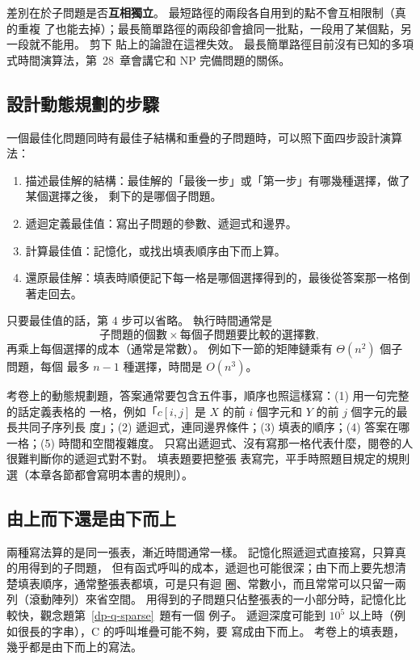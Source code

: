 差別在於子問題是否\textbf{互相獨立}。 最短路徑的兩段各自用到的點不會互相限制（真的重複
了也能去掉）；最長簡單路徑的兩段卻會搶同一批點，一段用了某個點，另一段就不能用。 剪下
貼上的論證在這裡失效。 最長簡單路徑目前沒有已知的多項式時間演算法，第~28~章會講它和
NP 完備問題的關係。

\subsection{設計動態規劃的步驟}
\label{sec:dp-steps}

一個最佳化問題同時有最佳子結構和重疊的子問題時，可以照下面四步設計演算法：

\begin{enumerate}
\item 描述最佳解的結構：最佳解的「最後一步」或「第一步」有哪幾種選擇，做了某個選擇之後，
剩下的是哪個子問題。
\item 遞迴定義最佳值：寫出子問題的參數、遞迴式和邊界。
\item 計算最佳值：記憶化，或找出填表順序由下而上算。
\item 還原最佳解：填表時順便記下每一格是哪個選擇得到的，最後從答案那一格倒著走回去。
\end{enumerate}

只要最佳值的話，第 4 步可以省略。 執行時間通常是
\[
\text{子問題的個數} \times \text{每個子問題要比較的選擇數},
\]
再乘上每個選擇的成本（通常是常數）。 例如下一節的矩陣鏈乘有 $\Theta(n^2)$ 個子問題，每個
最多 $n - 1$ 種選擇，時間是 $O(n^3)$。

\begin{examnote}
考卷上的動態規劃題，答案通常要包含五件事，順序也照這樣寫：(1) 用一句完整的話定義表格的
一格，例如「$c[i, j]$ 是 $X$ 的前 $i$ 個字元和 $Y$ 的前 $j$ 個字元的最長共同子序列長
度」；(2) 遞迴式，連同邊界條件；(3) 填表的順序；(4) 答案在哪一格；(5) 時間和空間複雜度。
只寫出遞迴式、沒有寫那一格代表什麼，閱卷的人很難判斷你的遞迴式對不對。 填表題要把整張
表寫完，平手時照題目規定的規則選（本章各節都會寫明本書的規則）。
\end{examnote}

\subsection{由上而下還是由下而上}

兩種寫法算的是同一張表，漸近時間通常一樣。 記憶化照遞迴式直接寫，只算真的用得到的子問題，
但有函式呼叫的成本，遞迴也可能很深；由下而上要先想清楚填表順序，通常整張表都填，可是只有迴
圈、常數小，而且常常可以只留一兩列（滾動陣列）來省空間。
用得到的子問題只佔整張表的一小部分時，記憶化比較快，觀念題第~\ref{dp-q-sparse}~題有一個
例子。 遞迴深度可能到 $10^5$ 以上時（例如很長的字串），C 的呼叫堆疊可能不夠，要
寫成由下而上。 考卷上的填表題，幾乎都是由下而上的寫法。

